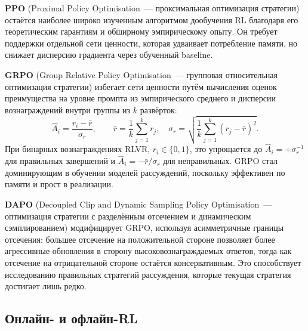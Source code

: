 \textbf{PPO} (Proximal Policy Optimisation~--- проксимальная оптимизация стратегии)
остаётся наиболее широко изученным алгоритмом дообучения RL благодаря
его теоретическим гарантиям и обширному эмпирическому опыту.
Он требует поддержки отдельной сети ценности, которая удваивает
потребление памяти, но снижает дисперсию градиента через обученный baseline.

\textbf{GRPO} (Group Relative Policy Optimisation~--- групповая относительная оптимизация стратегии) избегает
сети ценности путём вычисления оценок преимущества на уровне промпта из
эмпирического среднего и дисперсии вознаграждений внутри группы из $k$
развёрток:
\begin{equation}
\label{eq:grpo-advantage-ch15}
\hat{A}_i = \frac{r_i - \bar{r}}{\sigma_r}, \qquad
\bar{r} = \frac{1}{k}\sum_{j=1}^k r_j, \quad
\sigma_r = \sqrt{\frac{1}{k}\sum_{j=1}^k (r_j - \bar{r})^2}.
\end{equation}
При бинарных вознаграждениях RLVR, $r_i \in \{0, 1\}$, это упрощается до
$\hat{A}_i = +\sigma_r^{-1}$ для правильных завершений и
$\hat{A}_i = -\bar{r}/\sigma_r$ для неправильных. GRPO стал
доминирующим в обучении моделей рассуждений, поскольку эффективен по памяти
и прост в реализации.

\textbf{DAPO} (Decoupled Clip and Dynamic Sampling Policy
Optimisation~--- оптимизация стратегии с разделённым отсечением и динамическим сэмплированием) модифицирует GRPO, используя асимметричные границы отсечения: большее
отсечение на положительной стороне позволяет более агрессивные обновления в сторону
высоковознаграждаемых ответов, тогда как отсечение на отрицательной стороне остаётся консервативным.
Это способствует исследованию правильных стратегий рассуждения, которые
текущая стратегия достигает лишь редко.

\subsection{Онлайн- и офлайн-RL}
\label{subsec:online-offline}

